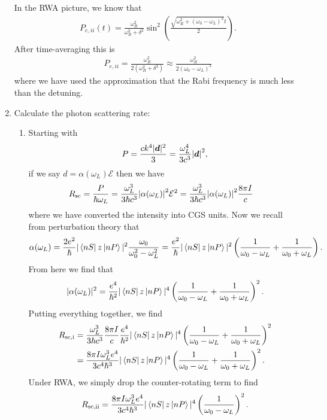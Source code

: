 \documentclass{article}
\theoremstyle{definition}
\newcommand{\al}{\alpha}
\newcommand{\f}[2]{\frac{#1}{#2}}
\newcommand{\lp}{\left(}
\newcommand{\rp}{\right)}
\begin{document}
\begin{enumerate}[label=(\alph*)]
	In the RWA picture, we know that
	\begin{align*}
	P_{e,ii}(t) = \f{\omega_R^2}{\omega^2_R + \delta^2} \sin^2 \lp \f{\sqrt{\omega_R^2 + (\omega_0 - \omega_L)^2} t}{2} \rp.
	\end{align*}
	After time-averaging this is 
	\begin{align*}
	P_{e,ii} = \f{\omega_R^2}{2(\omega^2_R + \delta^2)} \approx  {\f{\omega_R^2}{2 (\omega_0 - \omega_L)^2}}
	\end{align*}
	where we have used the approximation that the Rabi frequency is much less than the detuning.
	
	\item Calculate the photon scattering rate:
	
	\begin{enumerate}[label=(\roman*)]
		\item Starting with
		\begin{align*}
			P = \f{ck^4|\bm{d}|^2}{3} = \f{\omega_L^4}{3c^3}\abs{\bm{d}}^2,
		\end{align*}
		if we say $d = \al(\omega_L)\mathcal{E}$ then we have
		\begin{align*}
			R_\text{sc} &= \f{P}{\hbar \omega_L}= \f{\omega_L^3}{3\hbar c^3}\abs{\al(\omega_L)}^2 \mathcal{E}^2= \f{\omega_L^3}{3\hbar c^3}\abs{\al(\omega_L)}^2 \f{8\pi I}{c}
		\end{align*}
		where we have converted the intensity into CGS units. Now we recall from perturbation theory that
		\begin{align*}
			\al(\omega_L) = \f{2e^2}{\hbar} |\bra{nS} z \ket{nP}|^2 \f{\omega_0}{\omega_0^2 - \omega_L^2} = \f{e^2}{\hbar} |\bra{nS} z \ket{nP}|^2 \lp \f{1}{\omega_0 - \omega_L} + \f{1}{\omega_0 + \omega_L} \rp.
		\end{align*}
		From here we find that
		\begin{align*}
			|\al(\omega_L)|^2 = \f{e^4}{\hbar^2} |\bra{nS} z \ket{nP}|^4 \lp \f{1}{\omega_0 - \omega_L} + \f{1}{\omega_0 + \omega_L} \rp^2.
		\end{align*}
		Putting everything together, we find 
		\begin{align*}
			R_\text{sc,i} &= \f{\omega_L^3}{3\hbar c^3}\f{8\pi I}{c}\f{e^4}{\hbar^2} |\bra{nS} z \ket{nP}|^4 \lp \f{1}{\omega_0 - \omega_L} + \f{1}{\omega_0 + \omega_L} \rp^2\\
			&= \f{8\pi I\omega_L^3 e^4}{3 c^4 \hbar^3} |\bra{nS} z \ket{nP}|^4 \lp \f{1}{\omega_0 - \omega_L} + \f{1}{\omega_0 + \omega_L} \rp^2.
		\end{align*}
		Under RWA, we simply drop the counter-rotating term to find 
		\begin{align*}
			R_\text{sc,ii}= \f{8\pi I\omega_L^3 e^4}{3 c^4 \hbar^3} |\bra{nS} z \ket{nP}|^4 \lp \f{1}{\omega_0 - \omega_L} \rp^2.
		\end{align*}
		

\end{enumerate}
\end{enumerate}
\end{document}
